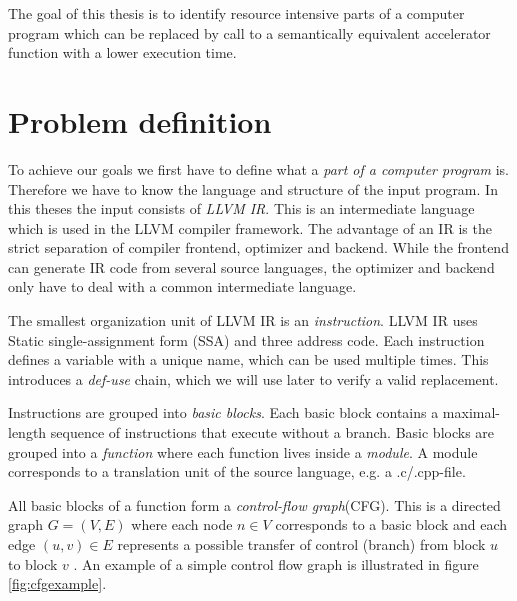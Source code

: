 
The goal of this thesis is to identify resource intensive parts of a computer program which can be replaced by call to a semantically equivalent accelerator function with a lower execution time. 
\section{Problem definition}
To achieve our goals we first have to define what a \textit{part of a computer program} is. Therefore we have to know the language and structure of the input program. In this theses the input consists of \textit{LLVM IR}. This is an intermediate language which is used in the LLVM compiler framework. The advantage of an IR is the strict separation of compiler frontend, optimizer and backend. While the frontend can generate IR code from several source languages, the optimizer and backend only have to deal with a common intermediate language.


The smallest organization unit of LLVM IR is an \textit{instruction}. LLVM IR uses Static single-assignment form (SSA) and three address code. Each instruction defines a variable with a unique name, which can be used multiple times. This introduces a \textit{def-use} chain, which we will use later to verify a valid replacement.

Instructions are grouped into \textit{basic blocks}. Each basic block contains a maximal-length sequence of instructions that execute without a branch. Basic blocks are grouped into a \textit{function} where each function lives inside a \textit{module}. A module corresponds to a translation unit of the source language, e.g. a .c/.cpp-file.

All basic blocks of a function form a \textit{control-flow graph}(CFG). This is a directed graph $G=(V,E)$ where each node $n \in V$ corresponds to a basic block and each edge $(u,v) \in E$ represents a possible transfer of control (branch) from block $u$ to block $v$ \cite{cooper2012engineering}. An example of a simple control flow graph is illustrated in figure \ref{fig:cfgexample}.

